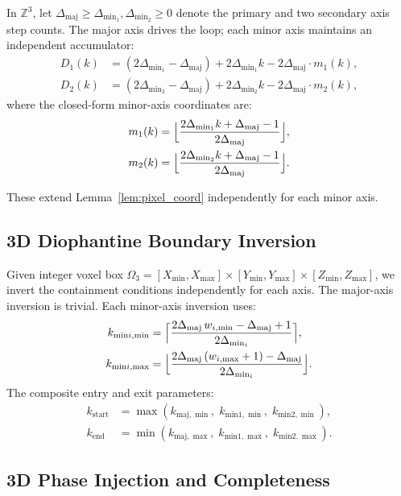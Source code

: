 \documentclass[12pt,a4paper]{article}
\theoremstyle{definition}
\newcommand{\Zth}{\mathbb{Z}^3}
\newcommand{\dmaj}{\Delta_{\mathrm{maj}}}
\newcommand{\dmin}[1]{\Delta_{\mathrm{min}_{#1}}}
\newcommand{\kst}{k_{\mathrm{start}}}
\newcommand{\ken}{k_{\mathrm{end}}}
\begin{document}
In $\Zth$, let $\dmaj \ge \dmin{1}, \dmin{2} \ge 0$
denote the primary and two secondary axis step counts.
The major axis drives the loop; each minor axis maintains
an independent accumulator:
\begin{align}
  D_1(k) &= (2\dmin{1} - \dmaj) + 2\dmin{1} k
    - 2\dmaj \cdot m_1(k),\label{eq:D1}\\
  D_2(k) &= (2\dmin{2} - \dmaj) + 2\dmin{2} k
    - 2\dmaj \cdot m_2(k),\label{eq:D2}
\end{align}
where the closed-form minor-axis coordinates are:
\begin{align}
  m_1(k) &= \Bigl\lfloor
    \frac{2\dmin{1} k + \dmaj - 1}{2\dmaj}
    \Bigr\rfloor,\label{eq:m1}\\
  m_2(k) &= \Bigl\lfloor
    \frac{2\dmin{2} k + \dmaj - 1}{2\dmaj}
    \Bigr\rfloor.\label{eq:m2}
\end{align}

These extend Lemma~\ref{lem:pixel_coord} independently
for each minor axis.

\subsection{3D Diophantine Boundary Inversion}

Given integer voxel box $\Omega_3 = [X_{\min}, X_{\max}]
\times [Y_{\min}, Y_{\max}] \times [Z_{\min}, Z_{\max}]$,
we invert the containment conditions independently for
each axis. The major-axis inversion is trivial.
Each minor-axis inversion uses:
\begin{align}
  k_{\mathrm{min}i,\min} &= \Bigl\lceil
    \frac{2\dmaj\, w_{i,\min} - \dmaj + 1}{2\dmin{i}}
    \Bigr\rceil,\label{eq:3d_kmin}\\
  k_{\mathrm{min}i,\max} &= \Bigl\lfloor
    \frac{2\dmaj\,(w_{i,\max}+1) - \dmaj}{2\dmin{i}}
    \Bigr\rfloor.\label{eq:3d_kmax}
\end{align}
The composite entry and exit parameters:
\begin{align}
  \kst &= \max(k_{\mathrm{maj},\min},\;
    k_{\mathrm{min1},\min},\; k_{\mathrm{min2},\min}),
    \label{eq:3d_kst}\\
  \ken &= \min(k_{\mathrm{maj},\max},\;
    k_{\mathrm{min1},\max},\; k_{\mathrm{min2},\max}).
    \label{eq:3d_ken}
\end{align}

\subsection{3D Phase Injection and Completeness}
\end{document}
